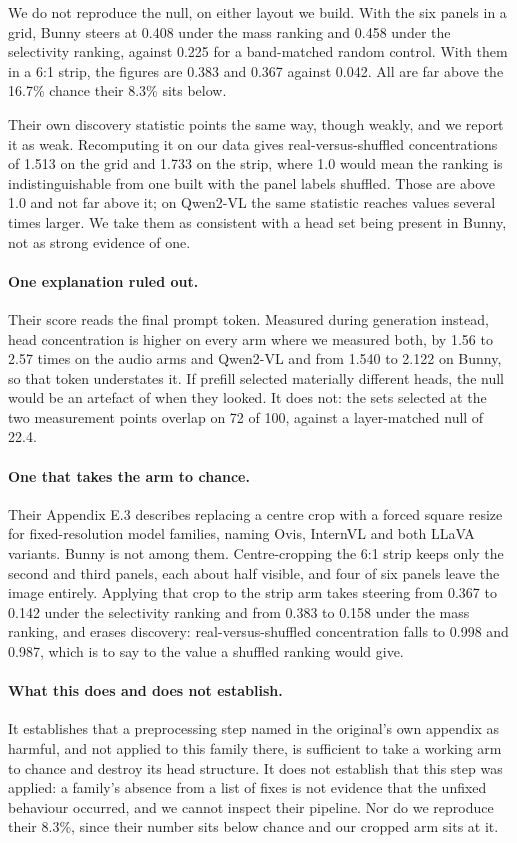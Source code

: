 \documentclass[11pt]{article}
\begin{document}
We do not reproduce the null, on either layout we build. With the six panels in a
grid, Bunny steers at 0.408 under the mass ranking and 0.458 under the
selectivity ranking, against 0.225 for a band-matched random control. With them
in a 6:1 strip, the figures are 0.383 and 0.367 against 0.042. All are far above
the 16.7\% chance their 8.3\% sits below.

Their own discovery statistic points the same way, though weakly, and we report
it as weak. Recomputing it on our data gives real-versus-shuffled concentrations
of 1.513 on the grid and 1.733 on the strip, where 1.0 would mean the ranking is
indistinguishable from one built with the panel labels shuffled. Those are above
1.0 and not far above it; on Qwen2-VL the same statistic reaches values several
times larger. We take them as consistent with a head set being present in Bunny,
not as strong evidence of one.

\paragraph{One explanation ruled out.}
Their score reads the final prompt token. Measured during generation instead,
head concentration is higher on every arm where we measured both, by 1.56 to 2.57
times on the audio arms and Qwen2-VL and from 1.540 to 2.122 on Bunny, so that
token understates it. If prefill selected materially different heads, the null would be an
artefact of when they looked. It does not: the sets selected at the two
measurement points overlap on 72 of 100, against a layer-matched null of 22.4.

\paragraph{One that takes the arm to chance.}
Their Appendix E.3 describes replacing a centre crop with a forced square resize
for fixed-resolution model families, naming Ovis, InternVL and both LLaVA
variants. Bunny is not among them.
Centre-cropping the 6:1 strip keeps only the second and third panels, each about
half visible, and four of six panels leave the image entirely. Applying that crop
to the strip arm takes steering from 0.367 to 0.142 under the selectivity ranking
and from 0.383 to 0.158 under the mass ranking, and erases discovery:
real-versus-shuffled concentration falls to 0.998 and 0.987, which is to say to
the value a shuffled ranking would give.

\paragraph{What this does and does not establish.}
It establishes that a preprocessing step named in the original's own appendix as
harmful, and not applied to this family there, is sufficient to take a working
arm to chance and destroy its head structure. It does not establish that this
step was applied: a family's absence from a list of fixes is not evidence that
the unfixed behaviour occurred, and we cannot inspect their pipeline. Nor do we reproduce their
8.3\%, since their number sits below chance and our cropped arm sits at it.
\end{document}
